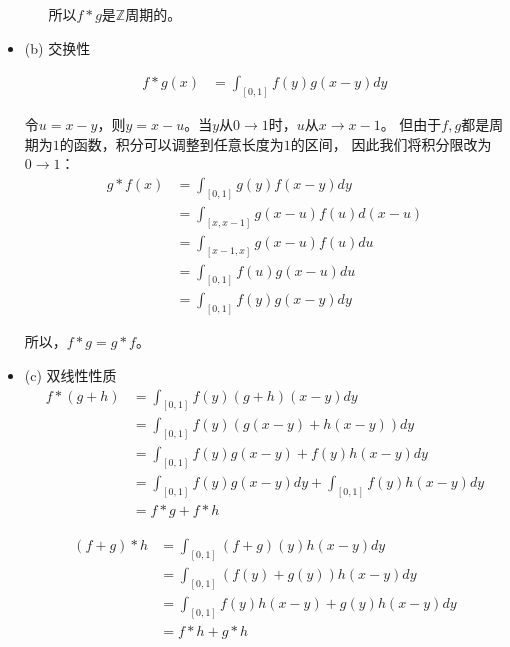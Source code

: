 \documentclass{article}
\begin{document}
\begin{itemize}
\begin{itemize}
                所以$f \ast g$是$\mathbb{Z}$周期的。
        \end{itemize}

  \item (b) 交换性

        \begin{align*}
          f \ast g (x) & = \int_{[0, 1]} f(y) g(x - y) dy
        \end{align*}

        令$u = x - y$，则$y = x - u$。当$y$从$0 \to 1$时，$u$从$x \to x - 1$。
        但由于$f,g$都是周期为$1$的函数，积分可以调整到任意长度为$1$的区间，
        因此我们将积分限改为$0 \to 1$：
        \begin{align*}
          g \ast f (x) & = \int_{[0, 1]} g(y) f(x - y) dy         \\
                       & = \int_{[x, x-1]} g(x - u) f(u) d(x - u) \\
                       & = \int_{[x - 1, x]} g(x - u) f(u) du     \\
                       & = \int_{[0, 1]} f(u) g(x - u)  du        \\
                       & = \int_{[0, 1]} f(y) g(x - y) dy
        \end{align*}

        所以，$f \ast g = g \ast f$。

  \item (c) 双线性性质
        \begin{align*}
          f \ast (g + h)
           & = \int_{[0, 1]} f(y) (g + h)(x - y) dy                         \\
           & = \int_{[0, 1]} f(y) (g(x - y) + h(x - y)) dy                  \\
           & = \int_{[0, 1]} f(y)g(x - y) + f(y)h(x - y) dy                 \\
           & = \int_{[0, 1]} f(y)g(x - y)dy + \int_{[0, 1]} f(y)h(x - y) dy \\
           & = f \ast g + f \ast h
        \end{align*}

        \begin{align*}
          (f + g) \ast h
           & = \int_{[0, 1]} (f+g)(y) h(x - y) dy           \\
           & = \int_{[0, 1]} (f(y)+g(y)) h(x - y) dy        \\
           & = \int_{[0, 1]} f(y)h(x - y) + g(y)h(x - y) dy \\
           & = f \ast h + g \ast h
        \end{align*}


\end{itemize}
\end{document}
